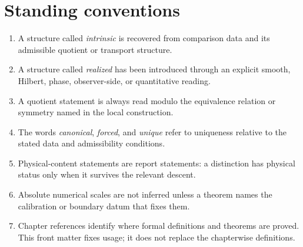 \section*{Standing conventions}
\begin{enumerate}[label=\textup{(\roman*)}]
\item A structure called \emph{intrinsic} is recovered from comparison
data and its admissible quotient or transport structure.
\item A structure called \emph{realized} has been introduced through an
explicit smooth, Hilbert, phase, observer-side, or quantitative reading.
\item A quotient statement is always read modulo the equivalence relation
or symmetry named in the local construction.
\item The words \emph{canonical}, \emph{forced}, and \emph{unique} refer
to uniqueness relative to the stated data and admissibility conditions.
\item Physical-content statements are report statements: a distinction
has physical status only when it survives the relevant descent.
\item Absolute numerical scales are not inferred unless a theorem names
the calibration or boundary datum that fixes them.
\item Chapter references identify where formal definitions and theorems
are proved.  This front matter fixes usage; it does not replace the
chapterwise definitions.
\end{enumerate}
